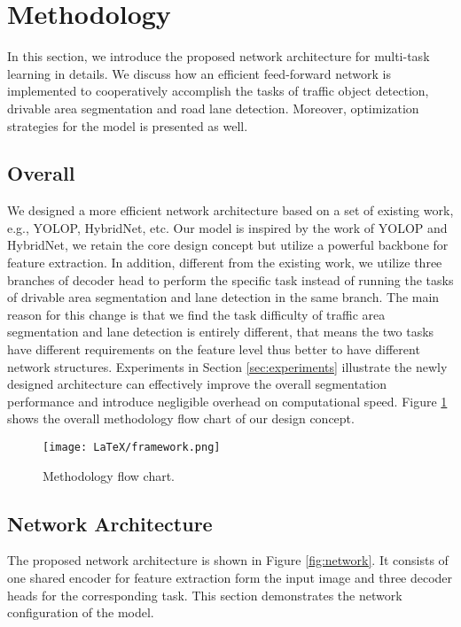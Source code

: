 \documentclass[10pt,twocolumn,letterpaper]{article}
\begin{document}
\section{Methodology}
In this section, we introduce the proposed network architecture for multi-task learning in details. We discuss how an efficient feed-forward network is implemented to cooperatively accomplish the tasks of traffic object detection, drivable area segmentation and road lane detection. Moreover, optimization strategies for the model is presented as well.

\subsection{Overall}
We designed a more efficient network architecture based on a set of existing work, e.g., YOLOP, HybridNet, etc.
Our model is inspired by the work of YOLOP and HybridNet, we retain the core design concept but utilize a powerful backbone for feature extraction. In addition, different from the existing work, we utilize three branches of decoder head to perform the specific task instead of running the tasks of drivable area segmentation and lane detection in the same branch.
The main reason for this change is that we find the task difficulty of traffic area segmentation and lane detection is entirely different, that means the two tasks have different requirements on the feature level thus better to have different network structures.
Experiments in Section \ref{sec:experiments} illustrate the newly designed architecture can effectively improve the overall segmentation performance and introduce negligible overhead on computational speed. Figure \ref{fig:flowchart} shows the overall methodology flow chart of our design concept.

\begin{figure}
        \begin{center}
            \texttt{[image: LaTeX/framework.png]}
        \end{center}
\caption{Methodology flow chart.}
        \label{fig:flowchart}        
\end{figure}

\subsection{Network Architecture}
The proposed network architecture is shown in Figure \ref{fig:network}. It consists of one shared encoder for feature extraction form the input image and three decoder heads for the corresponding task. This section demonstrates the network configuration of the model.
\end{document}
